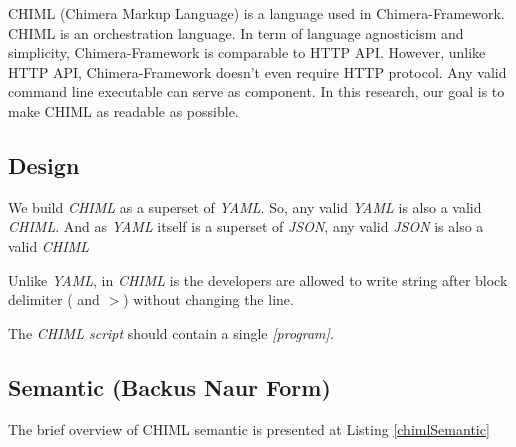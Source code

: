 \documentclass[conference]{IEEEtran}
\begin{document}
CHIML (Chimera Markup Language) is a language used in Chimera-Framework. CHIML is an orchestration language. In term of language agnosticism and simplicity, Chimera-Framework is comparable to HTTP API. However, unlike HTTP API, Chimera-Framework doesn't even require HTTP protocol. Any valid command line executable can serve as component. In this research, our goal is to make CHIML as readable as possible.

\subsection{Design}

We build {\it CHIML} as a superset of {\it YAML}. So, any valid {\it YAML} is also a valid {\it CHIML}. And as {\it YAML} itself is a superset of {\it JSON}, any valid {\it JSON} is also a valid {\it CHIML}

Unlike {\it YAML}, in {\it CHIML} is the developers are allowed to write string after block delimiter ({\it \textbar} and {\it $>$}) without changing the line.

The {\it CHIML script} should contain a single {\it [program]}.

\subsection{Semantic (Backus Naur Form)}

The brief overview of CHIML semantic is presented at Listing \ref{chimlSemantic}
\end{document}
